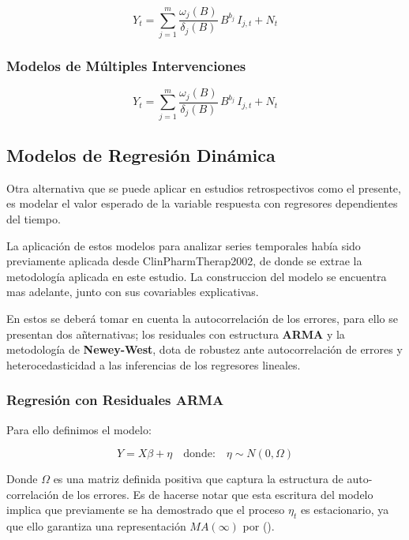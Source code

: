 \documentclass[10pt,twoside,xcolor=table,x11anmes]{IEEEtran}
\begin{document}
\begin{equation}
  Y_t = \sum_{j=1}^{m} \frac{\omega_j(B)}{\delta_j(B)}\, B^{b_j}\, I_{j,t} + N_t
\end{equation}

\subsubsection{Modelos de Múltiples Intervenciones}

\begin{equation}
  Y_t = \sum_{j=1}^{m} \frac{\omega_j(B)}{\delta_j(B)}\, B^{b_j}\, I_{j,t} + N_t
\end{equation}

\subsection[Modelos de Regresión Dinámica]{Modelos de Regresión Dinámica}

Otra alternativa que se puede aplicar en estudios retrospectivos como el presente, es modelar el valor esperado de la variable respuesta con regresores dependientes del tiempo. 

La aplicación de estos modelos para analizar series temporales había sido previamente aplicada desde ClinPharmTherap2002, de donde se extrae la metodología aplicada en este estudio. La construccion del modelo se encuentra mas adelante, junto con sus covariables explicativas.

En estos se deberá tomar en cuenta la autocorrelación de los errores, para ello se presentan dos añternativas; los residuales con estructura \textbf{ARMA} y la metodología de \textbf{Newey-West}, dota de robustez ante autocorrelación de errores y heterocedasticidad a las inferencias de los regresores lineales.

\subsubsection{Regresión con Residuales ARMA}

Para ello definimos el modelo:

$$Y=X\beta + \eta \quad\text{donde:}\quad \eta\sim N(0,\Omega)$$

Donde $\Omega$ es una matriz definida positiva que captura la estructura de auto-correlación de los errores. Es de hacerse notar que esta escritura del modelo implica que previamente se ha demostrado que el proceso $\eta_t$ es estacionario, ya que ello garantiza una representación $MA(\infty)$ por ().
\end{document}
